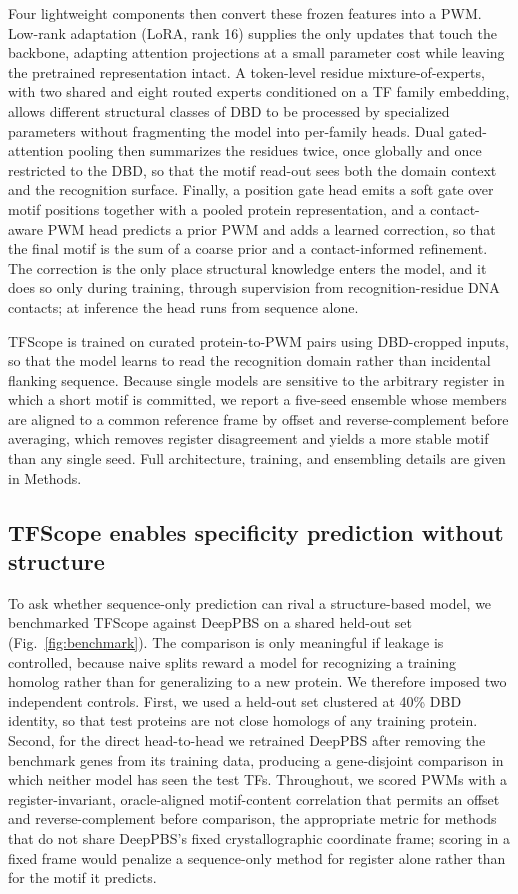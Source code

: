\documentclass[11pt]{article}
\begin{document}
Four lightweight components then convert these frozen features into a PWM. Low-rank
adaptation\cite{hu2022lora} (LoRA, rank 16) supplies the only updates that touch the
backbone, adapting attention projections at a small parameter cost while leaving the
pretrained representation intact. A token-level residue mixture-of-experts, with two
shared and eight routed experts conditioned on a TF family embedding, allows
different structural classes of DBD to be processed by specialized parameters
without fragmenting the model into per-family heads. Dual gated-attention pooling
then summarizes the residues twice, once globally and once restricted to the DBD, so
that the motif read-out sees both the domain context and the recognition surface.
Finally, a position gate head emits a soft gate over motif positions together with a
pooled protein representation, and a contact-aware PWM head predicts a prior PWM and
adds a learned correction, so that the final motif is the sum of a coarse prior and a
contact-informed refinement. The correction is the only place structural knowledge
enters the model, and it does so only during training, through supervision from
recognition-residue DNA contacts; at inference the head runs from sequence alone.

TFScope is trained on curated protein-to-PWM pairs using DBD-cropped inputs, so that
the model learns to read the recognition domain rather than incidental flanking
sequence. Because single models are sensitive to the arbitrary register in which a
short motif is committed, we report a five-seed ensemble whose members are aligned to
a common reference frame by offset and reverse-complement before averaging, which
removes register disagreement and yields a more stable motif than any single seed.
Full architecture, training, and ensembling details are given in Methods.

\subsection*{TFScope enables specificity prediction without structure}

To ask whether sequence-only prediction can rival a structure-based model, we
benchmarked TFScope against DeepPBS\cite{mitra2024deeppbs} on a shared held-out set
(Fig.~\ref{fig:benchmark}). The comparison is only meaningful if leakage is
controlled, because naive splits reward a model for recognizing a training homolog
rather than for generalizing to a new protein. We therefore imposed two independent
controls. First, we used a held-out set clustered at 40\% DBD identity, so that test
proteins are not close homologs of any training protein. Second, for the direct
head-to-head we retrained DeepPBS after removing the benchmark genes from its
training data, producing a gene-disjoint comparison in which neither model has seen
the test TFs. Throughout, we scored PWMs with a register-invariant, oracle-aligned
motif-content correlation that permits an offset and reverse-complement before
comparison, the appropriate metric for methods that do not share DeepPBS's fixed
crystallographic coordinate frame; scoring in a fixed frame would penalize a
sequence-only method for register alone rather than for the motif it predicts.
\end{document}
